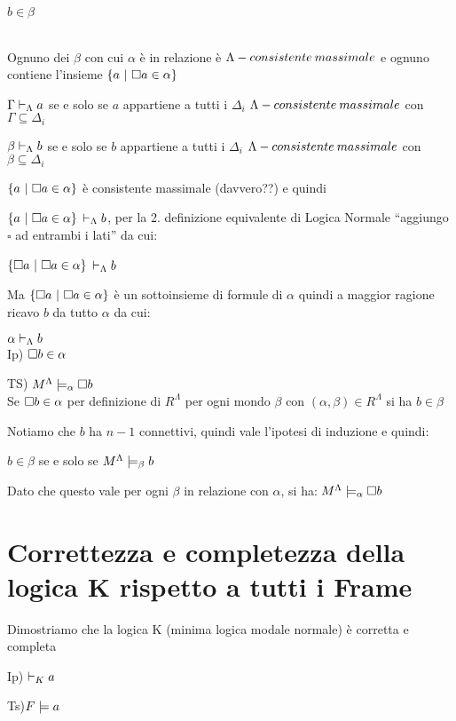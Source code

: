 $b\in\beta$

 \\


Ognuno dei $\beta$ con cui $\alpha$ è in relazione è $\Lambda-consistente\: massimale$
e ognuno contiene l'insieme $\{a\ |\ \boa\in\alpha\}$ 

$\Gamma\vdash_{\Lambda}a$ se e solo se $a$ appartiene a tutti i $\Delta_{i}$
$\Lambda-consistente\: massimale$ con $\Gamma\subseteq\Delta_{i}$

$\beta\vdash_{\Lambda}b$ se e solo se $b$ appartiene a tutti i $\Delta_{i}$
$\Lambda-consistente\: massimale$ con $\beta\subseteq\Delta_{i}$

$\{a\ |\ \boa\in\alpha\}$ è consistente massimale (davvero??) e quindi

$\{a\ |\ \boa\in\alpha\}$ $\vdash_{\Lambda}b$, per la 2. definizione equivalente
di Logica Normale ``aggiungo $\square$ ad entrambi i lati'' da
cui:

$\{\square a\ |\ \square a\in\alpha\}$ $\vdash_{\Lambda}b$

Ma $\{\square a\ |\ \square a\in\alpha\}$ è un sottoinsieme di formule di $\alpha$
quindi a maggior ragione ricavo $b$ da tutto $\alpha$ da cui:

$\alpha\vdash_{\Lambda}b$\\
Ip) $\square b\in\alpha$

TS) $M^{\Lambda}\models_{\alpha}\square b$\\
Se $\square b\in\alpha$ per definizione di $R^{\Lambda}$ per ogni
mondo $\beta$ con $(\alpha,\beta)\in R^{\Lambda}$ si ha $b\in\beta$

Notiamo che $b$ ha $n-1$ connettivi, quindi vale l'ipotesi di induzione
e quindi:

$ $$b\in\beta$ se e solo se $M^{\Lambda}\models_{\beta}b$

Dato che questo vale $ $per ogni $\beta$ in relazione con $\alpha$,
si ha: $M^{\Lambda}\models_{\alpha}\square b$


\section{Correttezza e completezza della logica K rispetto a tutti i Frame}

Dimostriamo che la logica K (minima logica modale normale) è corretta
e completa

Ip) $\vdash_{K}a$ 

Ts)$F\models a$\\


